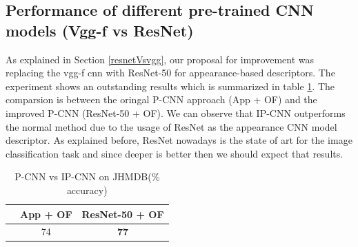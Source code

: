 \documentclass[10pt,twocolumn,letterpaper]{article}
\begin{document}
\subsection{Performance of different pre-trained CNN models (Vgg-f vs ResNet)}

As explained in Section \ref{resnetVsvgg}, our proposal for improvement was replacing the vgg-f cnn with ResNet-50 for appearance-based descriptors. The experiment shows an outstanding results which is summarized in table \ref{table:resnet}. The comparsion is between the oringal P-CNN approach (App + OF) and the improved P-CNN (ResNet-50 + OF). We can observe that IP-CNN outperforms the normal method due to the usage of ResNet as the appearance CNN model descriptor. As explained before, ResNet nowadays is the state of art for the image classification task and since deeper is better then we should expect that results. 

\begin{table}
	
	\begin{center}
		\begin{tabular}{ccc}
			& App + OF & ResNet-50 + OF \\ [0.5ex]
			\hline
			& 74 & \textbf{77}\\
			\hline
		\end{tabular}
	\end{center}
	\caption{P-CNN vs IP-CNN on JHMDB(\% accuracy)}
	\label{table:resnet}
\end{table}
\label{resnetVsvgg}
{\small


}
\end{document}
